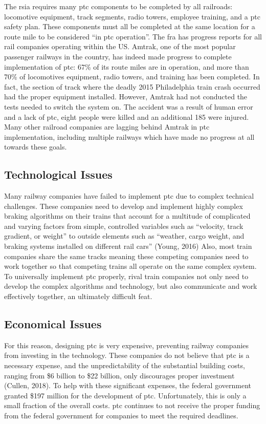 \documentclass[11pt, titlepage]{article}
\begin{document}
The \gls{rsia} requires many \gls{ptc} components to be completed by all
railroads: locomotive equipment, track segments, radio towers, employee training,
and a \gls{ptc} safety plan. These components must all be completed at the same
location for a route mile to be considered ``in \gls{ptc} operation''. The
\gls{fra} has progress reports for all rail companies operating within the US.
Amtrak, one of the most popular passenger railways in the country, has indeed made
progress to complete implementation of \gls{ptc}: 67\% of its route miles are in
operation, and more than 70\% of locomotives equipment, radio towers, and training
has been completed. In fact, the section of track where the deadly 2015
Philadelphia train crash occurred had the proper equipment installed. However,
Amtrak had not conducted the tests needed to switch the system on. The accident
was a result of human error and a lack of \gls{ptc}, eight people were killed and
an additional 185 were injured. Many other railroad companies are lagging behind
Amtrak in \gls{ptc} implementation, including multiple railways which have made no
progress at all towards these goals.

\subsection{Technological Issues}

Many railway companies have failed to implement \gls{ptc} due to complex technical
challenges. These companies need to develop and implement highly complex braking
algorithms on their trains that account for a multitude of complicated and varying
factors from simple, controlled variables such as ``velocity, track gradient, or
weight'' to outside elements such as ``weather, cargo weight, and braking systems
installed on different rail cars'' (Young, 2016) Also, most train companies share
the same tracks meaning these competing companies need to work together so that
competing trains all operate on the same complex system. To universally implement
\gls{ptc} properly, rival train companies not only need to develop the complex
algorithms and technology, but also communicate and work effectively together, an
ultimately difficult feat.

\subsection{Economical Issues}

For this reason, designing \gls{ptc} is very expensive, preventing railway
companies from investing in the technology. These companies do not believe that
\gls{ptc} is a necessary expense, and the unpredictability of the substantial
building costs, ranging from \$6 billion to \$22 billion, only discourages proper
investment (Cullen, 2018). To help with these significant expenses, the federal
government granted \$197 million for the development of \gls{ptc}. Unfortunately,
this is only a small fraction of the overall costs. \gls{ptc} continues to not
receive the proper funding from the federal government for companies to meet the
required deadlines.
\end{document}
